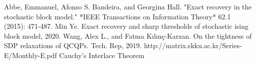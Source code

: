 \documentclass{article}
\begin{document}
\begin{thebibliography}{9}
	 Abbe, Emmanuel, Afonso S. Bandeira, and Georgina Hall. "Exact recovery in the stochastic block model." *IEEE Transactions on Information Theory* 62.1 (2015): 471-487.
	 	Min Ye.
	\newblock Exact recovery and sharp thresholds of stochastic ising block model,
	2020.
	 Wang, Alex L., and Fatma Kılınç-Karzan. On the tightness of SDP relaxations of QCQPs. Tech. Rep, 2019.
	 http://matrix.skku.ac.kr/Series-E/Monthly-E.pdf Cauchy’s Interlace Theorem
\end{thebibliography}
\end{document}
